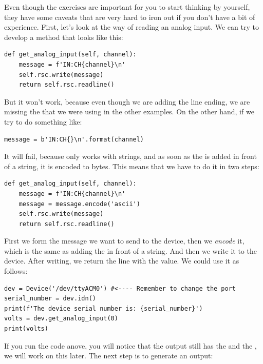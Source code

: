 
Even though the exercises are important for you to start thinking by yourself, they have some caveats that are very hard to iron out if you don't have a bit of experience. First, let's look at the way of reading an analog input. We can try to develop a method that looks like this:

\begin{verbatim}
def get_analog_input(self, channel):
    message = f'IN:CH{channel}\n'
    self.rsc.write(message)
    return self.rsc.readline()
\end{verbatim}

But it won't work, because even though we are adding the line ending, we are missing the  that we were using in the other examples. On the other hand, if we try to do something like:

\begin{verbatim}
message = b'IN:CH{}\n'.format(channel)
\end{verbatim}

It will fail, because  only works with strings, and as soon as the  is added in front of a string, it is encoded to bytes. This means that we have to do it in two steps:

\begin{verbatim}
def get_analog_input(self, channel):
    message = f'IN:CH{channel}\n'
    message = message.encode('ascii')
    self.rsc.write(message)
    return self.rsc.readline()
\end{verbatim}

First we form the message we want to send to the device, then we \emph{encode} it, which is the same as adding the  in front of a string. And then we write it to the device. After writing, we return the line with the value. We could use it as follows:

\begin{verbatim}
dev = Device('/dev/ttyACM0') #<---- Remember to change the port
serial_number = dev.idn()
print(f'The device serial number is: {serial_number}')
volts = dev.get_analog_input(0)
print(volts)
\end{verbatim}

If you run the code anove, you will notice that the output still has the  and the \py{\n}, we will work on this later. The next step is to generate an output:

